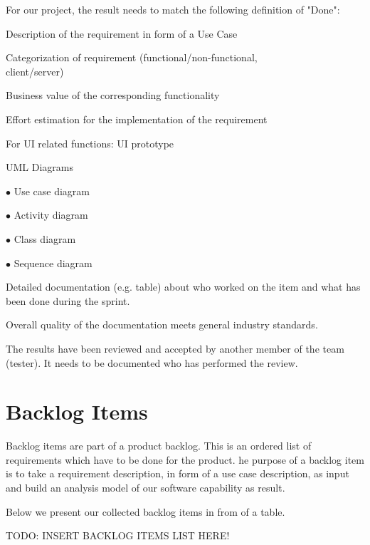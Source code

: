 \documentclass[a4paper, 12pt]{article}
\begin{document}
For our project, the result needs to match the following definition of "Done":
\begin{todolist}

\item Description of the requirement in form of a Use Case
\item Categorization of requirement (functional/non-functional,\\
      client/server)
\item Business value of the corresponding functionality
\item Effort estimation for the implementation of the requirement
\item For UI related functions: UI prototype
\item UML Diagrams 

    $\bullet$ Use case diagram
    
    $\bullet$ Activity diagram
    
    $\bullet$ Class diagram
    
    $\bullet$ Sequence diagram
    
\item Detailed documentation (e.g. table) about who worked on the item and what has been done during the sprint.
\item Overall quality of the documentation meets general industry standards.
\item The results have been reviewed and accepted by another member of the team (tester). It needs to be documented who has performed the review.

\end{todolist}


\section{Backlog Items}
Backlog items are part of a product backlog. This is an ordered list of requirements which have to be done for the product. he purpose of a backlog item is to take a requirement description, in form of a use case description, as input and build an analysis model of our software capability as result.

Below we present our collected backlog items in from of a table.

\color{red}TODO: INSERT BACKLOG ITEMS LIST HERE!\color{black}


\end{document}
